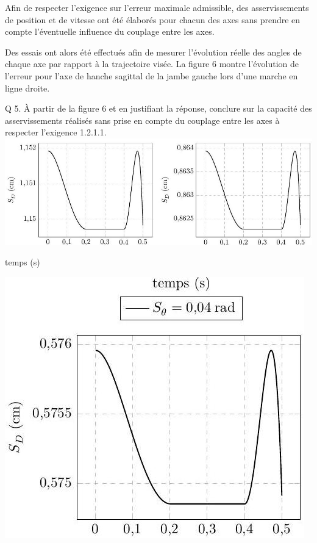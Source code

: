 \documentclass[10pt]{article}
\begin{document}
Afin de respecter l'exigence sur l'erreur maximale admissible, des asservissements de position et de vitesse ont été élaborés pour chacun des axes sans prendre en compte l'éventuelle influence du couplage entre les axes.

Des essais ont alors été effectués afin de mesurer l'évolution réelle des angles de chaque axe par rapport à la trajectoire visée. La figure 6 montre l'évolution de l'erreur pour l'axe de hanche sagittal de la jambe gauche lors d'une marche en ligne droite.

Q 5. À partir de la figure 6 et en justifiant la réponse, conclure sur la capacité des asservissements réalisés sans prise en compte du couplage entre les axes à respecter l'exigence 1.2.1.1.
\includegraphics[max width=\textwidth, center]{2023_05_12_54c6a64d2ffce28d5c72g-04(2)}

temps (s)

\begin{center}
\includegraphics[max width=\textwidth]{2023_05_12_54c6a64d2ffce28d5c72g-04}
\end{center}
\end{document}
